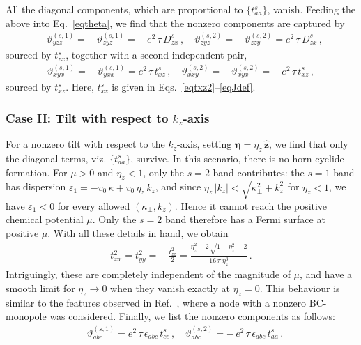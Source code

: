 \documentclass[aps,prb,onecolumn,nofootinbib,citeautoscript,10pt]{revtex4-2}
\newcommand{\bs}[1]{\boldsymbol{#1}}
\begin{document}
All the diagonal components, which are proportional to $ \lbrace t^s_{aa} \rbrace $, vanish.
Feeding the above into Eq.~\eqref{eqtheta}, we find that the nonzero components are captured by
\begin{align}
\label{eqtheta1}
& \vartheta_{y z z}^{(s,1)} = - \, \vartheta_{ z y z}^{(s,1)}
=  -\,e^2 \,\tau \, D^s_{zx}  \,,\quad
\vartheta_{z  yz}^{(s,2)}  = -\, \vartheta_{zzy}^{(s,2)} 
=  e^2 \, \tau\, D^s_{zx}\,,
\end{align}
sourced by $t^s_{zx}$, together with a second independent pair, 
\begin{align}
\label{eqtheta1b}
\vartheta_{x y x}^{(s,1)} = - \, \vartheta_{y x x}^{(s,1)} = e^2\, \tau \, t^s_{xz} \,,\quad
\vartheta_{x x y}^{(s,2)} = - \, \vartheta_{x y x}^{(s,2)} = -\, e^2 \, \tau \, t^s_{xz} \,,
\end{align}
sourced by $t^s_{xz}$.
Here, $t^s_{xz}$ is given in Eqs.~\eqref{eqtxz2}--\eqref{eqJdef}. 


\subsubsection{Case II: Tilt with respect to $ k_z $-axis}
 


For a nonzero tilt with respect to the $k_z$-axis, setting $\bs \eta = \eta_z \,\bs{\hat z}$, we find that only the diagonal terms, viz. $ \lbrace t^s_{aa} \rbrace $, survive. In this scenario, there is no horn-cyclide formation. For $\mu > 0$ and $\eta_z < 1$, only the $s=2$ band contributes: the $s=1$ band has dispersion $\varepsilon_1 = -v_0\,\kappa + v_0\,\eta_z\,k_z$, and since $\eta_z\,|k_z| < \sqrt{\kappa_\perp^2 + k_z^2}$ for $\eta_z < 1$, we have $\varepsilon_1 < 0$ for every allowed $(\kappa_\perp, k_z)$. Hence it cannot reach the positive chemical potential $\mu$. Only the $s=2$ band therefore has a Fermi surface at positive $\mu$. With all these details in hand, we obtain
\begin{align}
t^2_{xx} = t^2_{yy} = -\, \frac{t^2_{zz}} {2}
= \frac{\eta_z^2+2 \,\sqrt{1-\eta_z^2}-2} {16 \, \pi  \,\eta_z^3} \,.
\end{align}
Intriguingly, these are completely independent of the magnitude of $\mu$, and have a smooth limit for $\eta_z \rightarrow 0 $ when they vanish exactly at $\eta_z = 0 $. This behaviour is similar to the features observed in Ref.~\cite{ips-shreya}, where a node with a nonzero BC-monopole was considered. Finally, we list the nonzero components as follows:
\begin{align}
\label{eqtheta3}
& \vartheta_{a  b c}^{(s,1)} =  e^{2} \,\tau
\,\epsilon_{a b c }\, t^s_{cc} \,, 
\quad \vartheta_{a  b c}^{(s,2)}  = - \,e^2 \, \tau \, \epsilon_{ab c}\,t^s_{aa}   \,.
\end{align}
\end{document}
